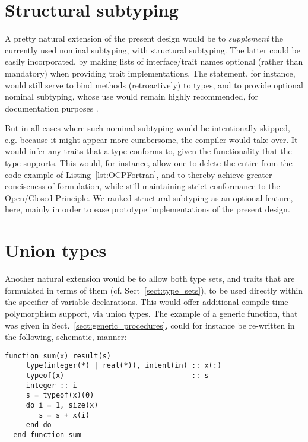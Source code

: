 \documentclass[11pt,oneside]{report}
\newcommand{\code}[1]{{\selectfont\ttfamily{#1}}}
\begin{document}
\section{Structural subtyping}
\label{sect:structural_subtyping}

A pretty natural extension of the present design would be to
\emph{supplement} the currently used nominal subtyping, with
structural subtyping. The latter could be easily incorporated, by
making lists of interface/trait names optional (rather than mandatory)
when providing trait implementations. The \code{implements} statement,
for instance, would still serve to bind methods (retroactively) to
types, and to provide optional nominal subtyping, whose use would
remain highly recommended, for documentation purposes \cite{MojoRef}.

But in all cases where such nominal subtyping would be intentionally
skipped, e.g. because it might appear more cumbersome, the compiler
would take over. It would infer any traits that a type conforms to,
given the functionality that the type supports. This would, for
instance, allow one to delete the entire \code{module intrinsics} from
the code example of Listing~\ref{lst:OCPFortran}, and to thereby
achieve greater conciseness of formulation, while still maintaining
strict conformance to the Open/Closed Principle. We ranked structural
subtyping as an optional feature, here, mainly in order to ease
prototype implementations of the present design.

\section{Union types}
\label{sect:union_types}

Another natural extension would be to allow both type sets, and
traits that are formulated in terms of them
(cf. Sect~\ref{sect:type_sets}), to be used directly within the
\code{type} specifier of variable declarations. This would offer
additional compile-time polymorphism support, via union types. The
example of a generic \code{sum} function, that was given in
Sect.~\ref{sect:generic_procedures}, could for instance be re-written
in the following, schematic, manner:
\begin{lstlisting}[language=LFortran,style=boxed]
  function sum(x) result(s)
     type(integer(*) | real(*)), intent(in) :: x(:)
     typeof(x)                              :: s
     integer :: i
     s = typeof(x)(0)
     do i = 1, size(x)
        s = s + x(i)
     end do
  end function sum
\end{lstlisting}
\end{document}

